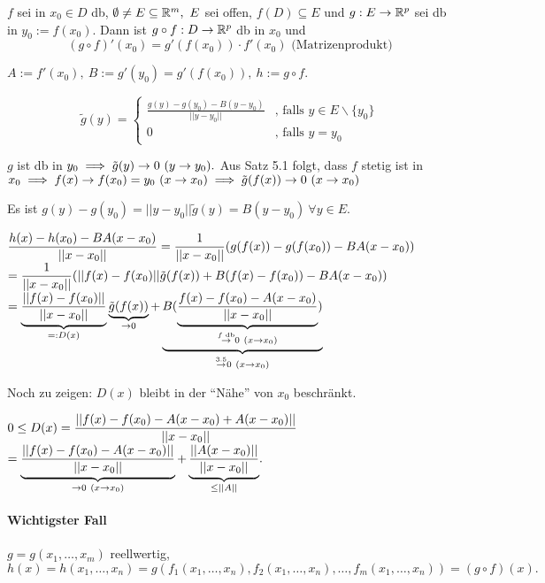\documentclass[a4paper,twoside,DIV15,BCOR12mm,chapterprefix=true,headings=twolinechapter]{scrbook}
\begin{document}
\begin{satz}[Kettenregel]
$f$ sei in $x_0 \in D$ db, $\emptyset \ne E \subseteq \MdR^m,\ E$ sei offen, $f(D) \subseteq E$ und $g:E \to \mathbb{R}^p$ sei db in $y_0 := f(x_0)$. Dann ist $g \circ f: D \to \mathbb{R}^p$ db in $x_0$ und $$(g \circ f)'(x_0) = g'(f(x_0))\cdot f'(x_0)\text{ (Matrizenprodukt)}$$
\end{satz}

\begin{beweis}
$A := f'(x_0),\ B := g'(y_0) = g'(f(x_0)),\ h := g \circ f.$

$$\tilde{g}(y) = \begin{cases}
\frac{g(y)-g(y_0)-B(y-y_0)}{||y-y_0||} & \text{, falls } y \in E\backslash\{y_0\} \\
0                                      & \text{, falls } y = y_0
\end{cases}$$

$g$ ist db in $y_0 \implies \tilde{g}(y) \to 0\ (y \to y_0).$ Aus Satz 5.1 folgt, dass $f$ stetig ist in $x_0 \implies f(x) \to f(x_0) = y_0\ (x \to x_0) \implies \tilde{g}(f(x)) \to 0\ (x \to x_0)$

Es ist $g(y) - g(y_0) = ||y-y_0|| \tilde{g}(y) = B(y-y_0)\ \forall y \in E.$

$\displaystyle{\frac{h(x)-h(x_0)-BA(x-x_0)}{||x-x_0||} = \frac{1}{||x-x_0||}(g(f(x))-g(f(x_0))-BA(x-x_0))}$\\
$\displaystyle{= \frac{1}{||x-x_0||} (||f(x)-f(x_0)|| \tilde{g}(f(x)) + B(f(x)-f(x_0))-BA(x-x_0))}$\\
$\displaystyle{= \underbrace{\frac{||f(x)-f(x_0)||}{||x-x_0||}}_{=:D(x)} \underbrace{\tilde{g}(f(x))}_{\to 0} + \underbrace{B(\underbrace{\frac{f(x)-f(x_0)-A(x-x_0)}{||x-x_0||}}_{\overset{f\text{ db}}{\to} 0\ (x \to x_0)})}_{\overset{\text{3.5}}{\to} 0\ (x \to x_0)}}$

Noch zu zeigen: $D(x)$ bleibt in der "`Nähe"' von $x_0$ beschränkt.

$0 \le D(x) = \displaystyle{\frac{||f(x)-f(x_0)-A(x-x_0)+A(x-x_0)||}{||x-x_0||}}$\\
$\displaystyle{= \underbrace{\frac{||f(x)-f(x_0)-A(x-x_0)||}{||x-x_0||}}_{\to 0\ (x \to x_0)} + \underbrace{\frac{||A(x-x_0)||}{||x-x_0||}}_{\le ||A||}}.$
\end{beweis}

\paragraph{Wichtigster Fall} $g = g(x_1,\ldots,x_m)$ reellwertig, $h(x) = h(x_1,\ldots,x_n) = g(f_1(x_1,\ldots,x_n),f_2(x_1,\ldots,x_n),\ldots,f_m(x_1,\ldots,x_n)) = (g \circ f)(x).$
\end{document}
